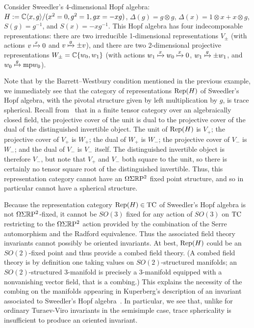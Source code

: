 \documentclass{amsart}
\begin{document}
\begin{example}
Consider Sweedler's 4-dimensional Hopf algebra: $H := \mathbb C \langle x, g \rangle / (x^2 = 0, g^2 = 1, gx = - xg)$, $\Delta(g) = g \otimes g$, $\Delta(x) = 1 \otimes x + x \otimes g$, $S(g) = g^{-1}$, and $S(x) = - xg^{-1}$.  This Hopf algebra has four indecomposable representations: there are two irreducible 1-dimensional representations $V_\pm$ (with actions $v \xmapsto{x} 0$ and $v \xmapsto{g} \pm v$), and there are two 2-dimensional projective representations $W_\pm = \mathbb C\{w_0, w_1\}$ (with actions $w_1 \xmapsto{x} w_0 \xmapsto{x} 0$, $w_1 \xmapsto{g} \pm w_1$, and $w_0 \xmapsto{g} \minusplus w_0$).

Note that by the Barrett--Westbury condition mentioned in the previous example, we immediately see that the category of representations $\mathrm{Rep}(H)$ of Sweedler's Hopf algebra, with the pivotal structure given by left multiplication by $g$, is trace spherical.  Recall from~\cite{MR2097289} that in a finite tensor category over an algebraically closed field, the projective cover of the unit is dual to the projective cover of the dual of the distinguished invertible object.  The unit of $\mathrm{Rep}(H)$ is $V_+$; the projective cover of $V_+$ is $W_+$; the dual of $W_+$ is $W_-$; the projective cover of $V_-$ is $W_-$; and the dual of $V_-$ is $V_-$ itself.  The distinguished invertible object is therefore $V_-$, but note that $V_+$ and $V_-$ both square to the unit, so there is certainly no tensor square root of the distinguished invertible.  Thus, this representation category cannot have an $\Omega \Sigma \mathbb R \mathrm{P}^2$ fixed point structure, and so in particular cannot have a spherical structure.
\end{example}


\begin{remark}
Because the representation category $\mathrm{Rep}(H) \in \mathrm{TC}$ of Sweedler's Hopf algebra is not $\Omega \Sigma \mathbb R \mathrm{P}^2$-fixed, it cannot be $SO(3)$ fixed for any action of $SO(3)$ on $\mathrm{TC}$ restricting to the $\Omega \Sigma \mathbb R \mathrm{P}^2$ action provided by the combination of the Serre automorphism and the Radford equivalence.  Thus the associated field theory invariants cannot possibly be oriented invariants.  At best, $\mathrm{Rep}(H)$ could be an $SO(2)$-fixed point and thus provide a combed field theory.  (A combed field theory is by definition one taking values on $SO(2)$-structured manifolds; an $SO(2)$-structured 3-manifold is precisely a 3-manifold equipped with a nonvanishing vector field, that is a combing.)  This explains the necessity of the combing on the manifolds appearing in Kuperberg's description of an invariant associated to Sweedler's Hopf algebra~\cite{MR1394749}.  In particular, we see that, unlike for ordinary Turaev-Viro invariants in the semisimple case, trace sphericality is insufficient to produce an oriented invariant.
\end{remark}
\end{document}
